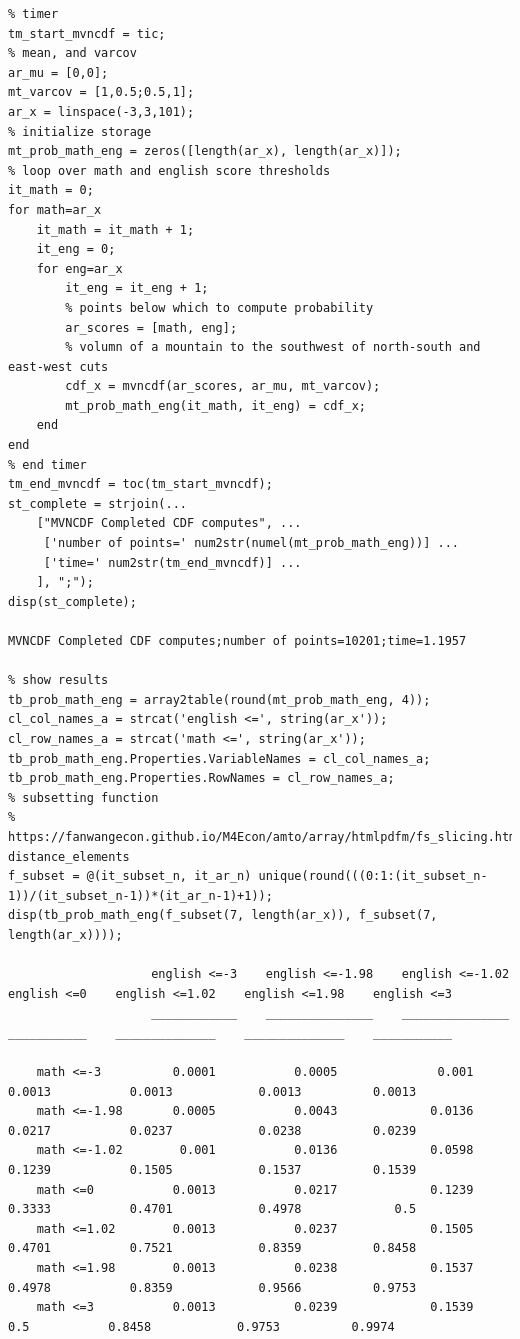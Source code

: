 \documentclass[
]{book}
\begin{document}
\begin{verbatim}
% timer
tm_start_mvncdf = tic;
% mean, and varcov
ar_mu = [0,0];
mt_varcov = [1,0.5;0.5,1];
ar_x = linspace(-3,3,101);
% initialize storage
mt_prob_math_eng = zeros([length(ar_x), length(ar_x)]);
% loop over math and english score thresholds
it_math = 0;
for math=ar_x
    it_math = it_math + 1;
    it_eng = 0;
    for eng=ar_x
        it_eng = it_eng + 1;
        % points below which to compute probability 
        ar_scores = [math, eng];
        % volumn of a mountain to the southwest of north-south and east-west cuts
        cdf_x = mvncdf(ar_scores, ar_mu, mt_varcov);
        mt_prob_math_eng(it_math, it_eng) = cdf_x;
    end
end
% end timer
tm_end_mvncdf = toc(tm_start_mvncdf);
st_complete = strjoin(...
    ["MVNCDF Completed CDF computes", ...
     ['number of points=' num2str(numel(mt_prob_math_eng))] ...
     ['time=' num2str(tm_end_mvncdf)] ...
    ], ";");
disp(st_complete);

MVNCDF Completed CDF computes;number of points=10201;time=1.1957

% show results
tb_prob_math_eng = array2table(round(mt_prob_math_eng, 4));
cl_col_names_a = strcat('english <=', string(ar_x'));
cl_row_names_a = strcat('math <=', string(ar_x'));
tb_prob_math_eng.Properties.VariableNames = cl_col_names_a;
tb_prob_math_eng.Properties.RowNames = cl_row_names_a;
% subsetting function
% https://fanwangecon.github.io/M4Econ/amto/array/htmlpdfm/fs_slicing.html#19_Given_Array_of_size_M,_Select_N_somewhat_equi-distance_elements
f_subset = @(it_subset_n, it_ar_n) unique(round(((0:1:(it_subset_n-1))/(it_subset_n-1))*(it_ar_n-1)+1));
disp(tb_prob_math_eng(f_subset(7, length(ar_x)), f_subset(7, length(ar_x))));

                    english <=-3    english <=-1.98    english <=-1.02    english <=0    english <=1.02    english <=1.98    english <=3
                    ____________    _______________    _______________    ___________    ______________    ______________    ___________

    math <=-3          0.0001           0.0005              0.001           0.0013           0.0013            0.0013          0.0013   
    math <=-1.98       0.0005           0.0043             0.0136           0.0217           0.0237            0.0238          0.0239   
    math <=-1.02        0.001           0.0136             0.0598           0.1239           0.1505            0.1537          0.1539   
    math <=0           0.0013           0.0217             0.1239           0.3333           0.4701            0.4978             0.5   
    math <=1.02        0.0013           0.0237             0.1505           0.4701           0.7521            0.8359          0.8458   
    math <=1.98        0.0013           0.0238             0.1537           0.4978           0.8359            0.9566          0.9753   
    math <=3           0.0013           0.0239             0.1539              0.5           0.8458            0.9753          0.9974   
\end{verbatim}
\end{document}
